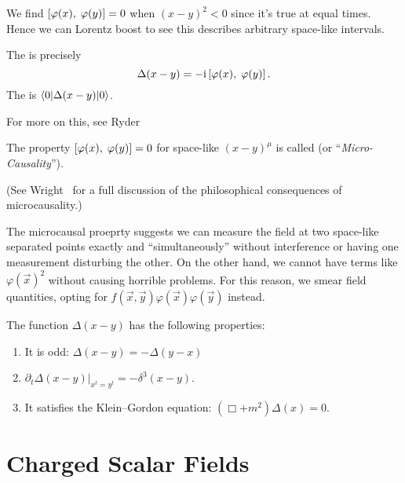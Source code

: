  We find $\left\lbrack\varphi(x),\;\varphi(y)\right\rbrack=0$ when
$(x-y)^{2}<0$ since it's true at equal times. Hence we can Lorentz boost
to see this describes arbitrary space-like intervals.

The 
is precisely 
\begin{equation}
\Delta(x-y) = -\mathrm{i}\left\lbrack\varphi(x),\;\varphi(y)\right\rbrack.
\end{equation}
The 
is $\braket{0|\Delta(x-y)|0}$.

\begin{remark}
For more on this, see Ryder~\cite[\S4.2 and \S6.1]{Ryder:1985wq}
\end{remark}

The property $\left\lbrack\varphi(x),\;\varphi(y)\right\rbrack=0$ for space-like
$(x-y)^{\mu}$ is called 
(or ``\emph{Micro-Causality\/}''). 

(See Wright~\cite{wright2012thesis} for a full discussion of the
philosophical consequences of microcausality.)

The microcausal proeprty suggests we can measure the field at two 
space-like separated points exactly and ``simultaneously'' without 
interference or having one measurement disturbing the other. On 
the other hand, we cannot have terms like $\varphi(\vec{x})^{2}$ 
without causing horrible problems. For this reason, we 
smear 
field quantities, opting for 
$f(\vec{x}, \vec{y})\varphi(\vec{x})\varphi(\vec{y})$ 
instead.

\begin{theorem}
The function $\Delta(x-y)$ has the following properties:
\begin{enumerate}
\item It is odd: $\Delta(x-y)=-\Delta(y-x)$
\item $\left.\partial_{t}\Delta(x-y)\right|_{x^{t}=y^{t}} = -\delta^{3}(x-y)$.
\item It satisfies the Klein--Gordon equation: $(\Box + m^{2})\Delta(x)=0$.
\end{enumerate}
\end{theorem}

\M


\section{Charged Scalar Fields}

